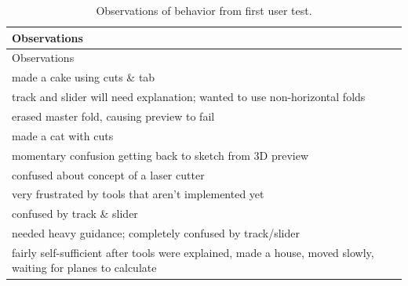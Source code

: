 \begin{longtable}[c]{@{}l@{}}
\caption{Observations of behavior from first user test.}\tabularnewline
\toprule
\begin{minipage}[b]{0.82\columnwidth}\raggedright\strut
Observations
\strut\end{minipage}\tabularnewline
\midrule
\endfirsthead
\toprule
\begin{minipage}[b]{0.82\columnwidth}\raggedright\strut
Observations
\strut\end{minipage}\tabularnewline
\midrule
\endhead
\begin{minipage}[t]{0.82\columnwidth}\raggedright\strut
made a cake using cuts \& tab
\strut\end{minipage}\tabularnewline
\begin{minipage}[t]{0.82\columnwidth}\raggedright\strut
track and slider will need explanation; wanted to use non-horizontal
folds
\strut\end{minipage}\tabularnewline
\begin{minipage}[t]{0.82\columnwidth}\raggedright\strut
erased master fold, causing preview to fail
\strut\end{minipage}\tabularnewline
\begin{minipage}[t]{0.82\columnwidth}\raggedright\strut
made a cat with cuts
\strut\end{minipage}\tabularnewline
\begin{minipage}[t]{0.82\columnwidth}\raggedright\strut
momentary confusion getting back to sketch from 3D preview
\strut\end{minipage}\tabularnewline
\begin{minipage}[t]{0.82\columnwidth}\raggedright\strut
confused about concept of a laser cutter
\strut\end{minipage}\tabularnewline
\begin{minipage}[t]{0.82\columnwidth}\raggedright\strut
very frustrated by tools that aren't implemented yet
\strut\end{minipage}\tabularnewline
\begin{minipage}[t]{0.82\columnwidth}\raggedright\strut
confused by track \& slider
\strut\end{minipage}\tabularnewline
\begin{minipage}[t]{0.82\columnwidth}\raggedright\strut
needed heavy guidance; completely confused by track/slider
\strut\end{minipage}\tabularnewline
\begin{minipage}[t]{0.82\columnwidth}\raggedright\strut
fairly self-sufficient after tools were explained, made a house, moved
slowly, waiting for planes to calculate
\strut\end{minipage}\tabularnewline
\bottomrule
\end{longtable}

